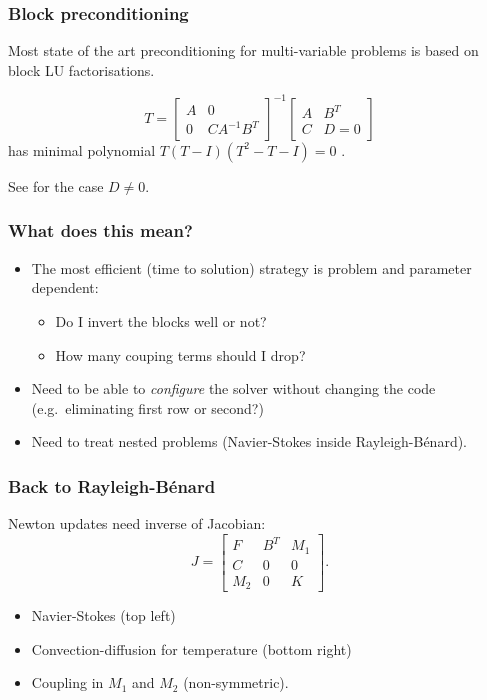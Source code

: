 \documentclass[presentation]{beamer}
\begin{document}
\begin{frame}
  \frametitle{Block preconditioning}
  Most state of the art preconditioning for multi-variable
  problems is based on block LU factorisations.

  \begin{equation*}
    T = \begin{bmatrix}
      A & 0 \\
      0 & C A^{-1} B^T
    \end{bmatrix}^{-1}
    \begin{bmatrix}
      A & B^T \\
      C & D = 0
    \end{bmatrix}
  \end{equation*}
  has minimal polynomial $T(T - I)(T^2 - T - I) =
  0$ \parencite{Murphy:2000}.

  See \textcite{Ipsen:2001} for the case $D \ne 0$.
\end{frame}

\begin{frame}
  \frametitle{What does this mean?}
  \begin{itemize}
  \item The most efficient (time to solution) strategy is problem and
    parameter dependent:
    \begin{itemize}
    \item Do I invert the blocks well or not?
    \item How many couping terms should I drop?
    \end{itemize}
  \item Need to be able to \emph{configure} the solver without
    changing the code (e.g.~eliminating first row or second?)
  \item Need to treat nested problems (Navier-Stokes inside Rayleigh-B\'enard).
  \end{itemize}
\end{frame}

\begin{frame}
  \frametitle{Back to Rayleigh-B\'enard}
  Newton updates need inverse of Jacobian:
  \begin{equation*}
    J = \begin{bmatrix}
      F   & B^T & M_1 \\
      C   & 0   & 0   \\
      M_2 & 0   & K
    \end{bmatrix}.
  \end{equation*}
  \begin{itemize}
  \item Navier-Stokes (top left)
  \item Convection-diffusion for temperature (bottom right)
  \item Coupling in $M_1$ and $M_2$ (non-symmetric).
  \end{itemize}
\end{frame}
\end{document}
